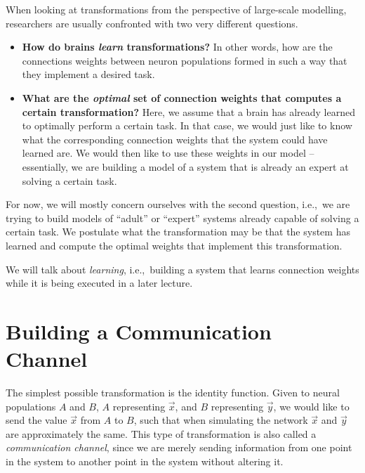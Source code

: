 \documentclass[10pt,letterpaper,oneside]{article}
\begin{document}
When looking at transformations from the perspective of large-scale modelling, researchers are usually confronted with two very different questions.
\begin{itemize}
	\item \textbf{How do brains \emph{learn} transformations?}
	In other words, how are the connections weights between neuron populations formed in such a way that they implement a desired task.
	\item \textbf{What are the \emph{optimal} set of connection weights that computes a certain transformation?}
	Here, we assume that a brain has already learned to optimally perform a certain task. In that case, we would just like to know what the corresponding connection weights that the system could have learned are. We would then like to use these weights in our model -- essentially, we are building a model of a system that is already an expert at solving a certain task.
\end{itemize}
For now, we will mostly concern ourselves with the second question, i.e.,~we are trying to build models of \enquote{adult} or \enquote{expert} systems already capable of solving a certain task. We postulate what the transformation may be that the system has learned and compute the optimal weights that implement this transformation.

We will talk about \emph{learning}, i.e.,~building a system that learns connection weights while it is being executed in a later lecture.

\section{Building a Communication Channel}

The simplest possible transformation is the identity function. Given to neural populations $A$ and $B$, $A$ representing $\vec x$, and $B$ representing $\vec y$, we would like to send the value $\vec x$ from $A$ to $B$, such that when simulating the network $\vec x$ and $\vec y$ are approximately the same. This type of transformation is also called a \emph{communication channel}, since we are merely sending information from one point in the system to another point in the system without altering it.

\newpage

\ConstructionSite
\end{document}
